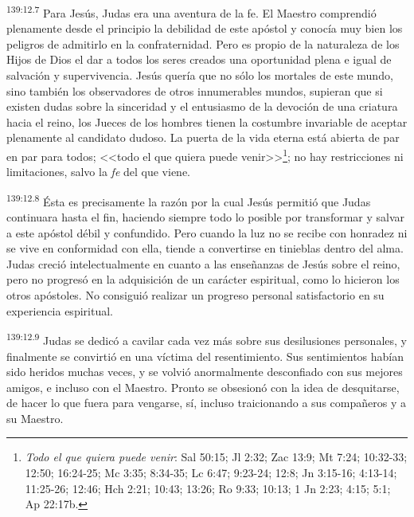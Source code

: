 \par 
\textsuperscript{139:12.7} Para Jesús, Judas era una aventura de la fe. El Maestro comprendió plenamente desde el principio la debilidad de este apóstol y conocía muy bien los peligros de admitirlo en la confraternidad. Pero es propio de la naturaleza de los Hijos de Dios el dar a todos los seres creados una oportunidad plena e igual de salvación y supervivencia. Jesús quería que no sólo los mortales de este mundo, sino también los observadores de otros innumerables mundos, supieran que si existen dudas sobre la sinceridad y el entusiasmo de la devoción de una criatura hacia el reino, los Jueces de los hombres tienen la costumbre invariable de aceptar plenamente al candidato dudoso. La puerta de la vida eterna está abierta de par en par para todos; <<todo el que quiera puede venir>>\footnote{\textit{Todo el que quiera puede venir}: Sal 50:15; Jl 2:32; Zac 13:9; Mt 7:24; 10:32-33; 12:50; 16:24-25; Mc 3:35; 8:34-35; Lc 6:47; 9:23-24; 12:8; Jn 3:15-16; 4:13-14; 11:25-26; 12:46; Hch 2:21; 10:43; 13:26; Ro 9:33; 10:13; 1 Jn 2:23; 4:15; 5:1; Ap 22:17b.}; no hay restricciones ni limitaciones, salvo la \textit{fe} del que viene.

\par 
\textsuperscript{139:12.8} Ésta es precisamente la razón por la cual Jesús permitió que Judas continuara hasta el fin, haciendo siempre todo lo posible por transformar y salvar a este apóstol débil y confundido. Pero cuando la luz no se recibe con honradez ni se vive en conformidad con ella, tiende a convertirse en tinieblas dentro del alma. Judas creció intelectualmente en cuanto a las enseñanzas de Jesús sobre el reino, pero no progresó en la adquisición de un carácter espiritual, como lo hicieron los otros apóstoles. No consiguió realizar un progreso personal satisfactorio en su experiencia espiritual.

\par 
\textsuperscript{139:12.9} Judas se dedicó a cavilar cada vez más sobre sus desilusiones personales, y finalmente se convirtió en una víctima del resentimiento. Sus sentimientos habían sido heridos muchas veces, y se volvió anormalmente desconfiado con sus mejores amigos, e incluso con el Maestro. Pronto se obsesionó con la idea de desquitarse, de hacer lo que fuera para vengarse, sí, incluso traicionando a sus compañeros y a su Maestro.

